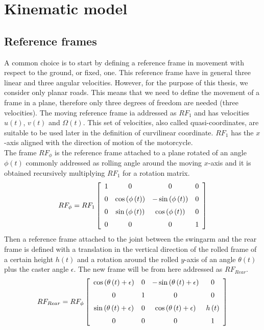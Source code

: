 \section{Kinematic model}
%
\subsection{Reference frames}
%
A common choice is to start by defining a reference frame in movement with respect to the ground, or fixed, one. This reference frame have in general three linear and three angular velocities. However, for the purpose of this thesis, we consider only planar roads. This means that we need to define the movement of a frame in a plane, therefore only three degrees of freedom are needed (three velocities). The moving reference frame ia addressed as $RF_1$ and has velocities $u(t)$, $v(t)$ and $\Omega(t)$. This set of velocities, also called quasi-coordinates, are suitable to be used later in the definition of curvilinear coordinate. $RF_1$ has the $x$-axis aligned with the direction of motion of the motorcycle. \\
The frame $RF_\phi$ is the reference frame attached to a plane rotated of an angle $\phi(t)$ commonly addressed as rolling angle around the moving $x$-axis and it is obtained recursively multiplying $RF_1$ for a rotation matrix.
%
\begin{equation}
    RF_\phi = RF_1 
    \left[ \begin {array}{cccc} 1&0&0&0\\ \noalign{\medskip}0&\cos
    \left( \phi \left( t \right)  \right) &-\sin \left( \phi \left( t
    \right)  \right) &0\\ \noalign{\medskip}0&\sin \left( \phi \left( t
    \right)  \right) &\cos \left( \phi \left( t \right)  \right) &0
   \\ \noalign{\medskip}0&0&0&1\end {array} \right]   
\end{equation}
%
Then a reference frame attached to the joint between the swingarm and the rear frame is defined with a translation in the vertical direction of the rolled frame of a certain height $h(t)$ and a rotation around the rolled $y$-axis of an angle $\theta(t)$ plus the caster angle $\epsilon$. The new frame will be from here addressed as $RF_{Rear}$.
%
\begin{equation}
    RF_{Rear} = RF_\phi 
    \left[ \begin {array}{cccc} \cos \left( \theta \left( t \right) +
    \epsilon \right) &0&-\sin \left( \theta \left( t \right) +\epsilon
    \right) &0\\ \noalign{\medskip}0&1&0&0\\ \noalign{\medskip}\sin
    \left( \theta \left( t \right) +\epsilon \right) &0&\cos \left( 
    \theta \left( t \right) +\epsilon \right) &h \left( t \right) 
    \\ \noalign{\medskip}0&0&0&1\end {array} \right] 
\end{equation}
